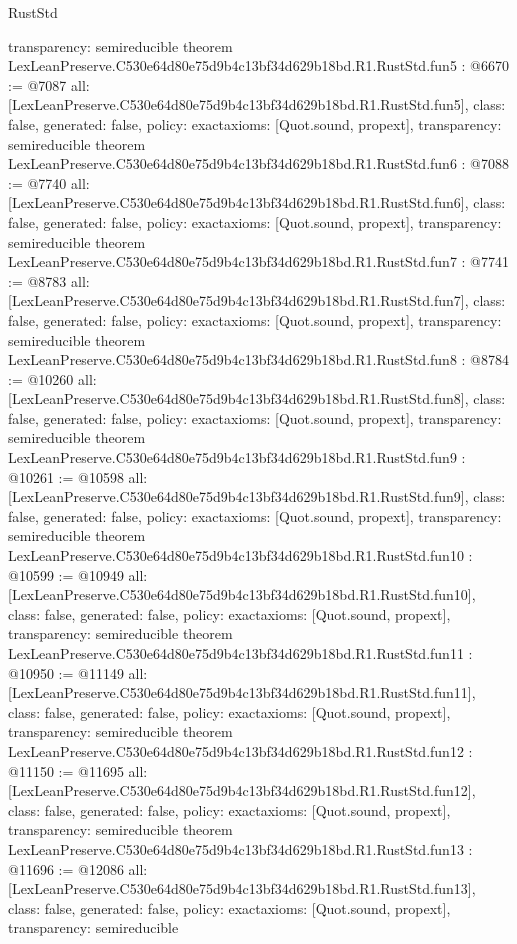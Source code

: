\begin{lexlean}{RustStd}
\begin{coremodule}
{  transparency: semireducible
}
theorem LexLeanPreserve.C530e64d80e75d9b4c13bf34d629b18bd.R1.RustStd.fun5 : @6670 := @7087 {
  all: [LexLeanPreserve.C530e64d80e75d9b4c13bf34d629b18bd.R1.RustStd.fun5],
  class: false,
  generated: false,
  policy: exact{axioms: [Quot.sound, propext]},
  transparency: semireducible
}
theorem LexLeanPreserve.C530e64d80e75d9b4c13bf34d629b18bd.R1.RustStd.fun6 : @7088 := @7740 {
  all: [LexLeanPreserve.C530e64d80e75d9b4c13bf34d629b18bd.R1.RustStd.fun6],
  class: false,
  generated: false,
  policy: exact{axioms: [Quot.sound, propext]},
  transparency: semireducible
}
theorem LexLeanPreserve.C530e64d80e75d9b4c13bf34d629b18bd.R1.RustStd.fun7 : @7741 := @8783 {
  all: [LexLeanPreserve.C530e64d80e75d9b4c13bf34d629b18bd.R1.RustStd.fun7],
  class: false,
  generated: false,
  policy: exact{axioms: [Quot.sound, propext]},
  transparency: semireducible
}
theorem LexLeanPreserve.C530e64d80e75d9b4c13bf34d629b18bd.R1.RustStd.fun8 : @8784 := @10260 {
  all: [LexLeanPreserve.C530e64d80e75d9b4c13bf34d629b18bd.R1.RustStd.fun8],
  class: false,
  generated: false,
  policy: exact{axioms: [Quot.sound, propext]},
  transparency: semireducible
}
theorem LexLeanPreserve.C530e64d80e75d9b4c13bf34d629b18bd.R1.RustStd.fun9 : @10261 := @10598 {
  all: [LexLeanPreserve.C530e64d80e75d9b4c13bf34d629b18bd.R1.RustStd.fun9],
  class: false,
  generated: false,
  policy: exact{axioms: [Quot.sound, propext]},
  transparency: semireducible
}
theorem LexLeanPreserve.C530e64d80e75d9b4c13bf34d629b18bd.R1.RustStd.fun10 : @10599 := @10949 {
  all: [LexLeanPreserve.C530e64d80e75d9b4c13bf34d629b18bd.R1.RustStd.fun10],
  class: false,
  generated: false,
  policy: exact{axioms: [Quot.sound, propext]},
  transparency: semireducible
}
theorem LexLeanPreserve.C530e64d80e75d9b4c13bf34d629b18bd.R1.RustStd.fun11 : @10950 := @11149 {
  all: [LexLeanPreserve.C530e64d80e75d9b4c13bf34d629b18bd.R1.RustStd.fun11],
  class: false,
  generated: false,
  policy: exact{axioms: [Quot.sound, propext]},
  transparency: semireducible
}
theorem LexLeanPreserve.C530e64d80e75d9b4c13bf34d629b18bd.R1.RustStd.fun12 : @11150 := @11695 {
  all: [LexLeanPreserve.C530e64d80e75d9b4c13bf34d629b18bd.R1.RustStd.fun12],
  class: false,
  generated: false,
  policy: exact{axioms: [Quot.sound, propext]},
  transparency: semireducible
}
theorem LexLeanPreserve.C530e64d80e75d9b4c13bf34d629b18bd.R1.RustStd.fun13 : @11696 := @12086 {
  all: [LexLeanPreserve.C530e64d80e75d9b4c13bf34d629b18bd.R1.RustStd.fun13],
  class: false,
  generated: false,
  policy: exact{axioms: [Quot.sound, propext]},
  transparency: semireducible
}
\end{coremodule}
\end{lexlean}
